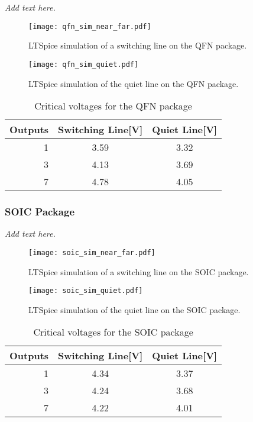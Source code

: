 \documentclass[../main.tex]{subfiles}
\begin{document}
\textit{Add text here.}
\lipsum[2]

\begin{figure}[h]
    \centering
    \texttt{[image: qfn\_sim\_near\_far.pdf]}
    \caption{LTSpice simulation of a switching line on the QFN package.}
    \label{fig:qfn_sim_near_far}
\end{figure}

\newpage

\begin{figure}[h]
    \centering
    \texttt{[image: qfn\_sim\_quiet.pdf]}
    \caption{LTSpice simulation of the quiet line on the QFN package.}
    \label{fig:qfn_sim_quiet}
\end{figure}

\begin{table}[h]
    \centering
    \begin{tabular}{r|c c}
        \toprule[1pt]
        \textbf{Outputs} & \textbf{Switching Line[V]} &\textbf{Quiet Line[V]} \\
        \midrule
        1  & 3.59  & 3.32 \\
        3  & 4.13  & 3.69 \\
        7  & 4.78  & 4.05  \\
        \bottomrule[1pt]
    \end{tabular}
    \caption{Critical voltages for the QFN package}
\end{table}

\subsubsection{SOIC Package}

\textit{Add text here.}
\lipsum[2]

\begin{figure}[h]
    \centering
    \texttt{[image: soic\_sim\_near\_far.pdf]}
    \caption{LTSpice simulation of a switching line on the SOIC package.}
    \label{fig:soic_sim_near_far}
\end{figure}

\newpage

\begin{figure}[h]
    \centering
    \texttt{[image: soic\_sim\_quiet.pdf]}
    \caption{LTSpice simulation of the quiet line on the SOIC package.}
    \label{fig:soic_sim_quiet}
\end{figure}

\newpage

\begin{table}[h]
    \centering
    \begin{tabular}{r|c c}
        \toprule[1pt]
        \textbf{Outputs} & \textbf{Switching Line[V]} &\textbf{Quiet Line[V]} \\
        \midrule
        1  & 4.34  & 3.37 \\
        3  & 4.24  & 3.68 \\
        7  & 4.22  & 4.01  \\
        \bottomrule[1pt]
    \end{tabular}
    \caption{Critical voltages for the SOIC package}
\end{table}
\end{document}
